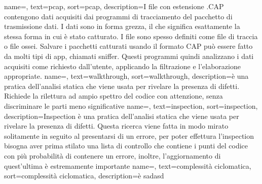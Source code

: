 {
name=,
text=pcap,
sort=pcap,
description={I file con estensione .CAP contengono dati acquisiti dai programmi di tracciamento del pacchetto di trasmissione dati.
I dati sono in forma grezza, il che significa esattamente la stessa forma in cui è stato catturato.
I file sono spesso definiti come file di traccia o file ossei.
Salvare i pacchetti catturati usando il formato CAP può essere fatto da molti tipi di app, chiamati sniffer. Questi programmi quindi analizzano i dati acquisiti come richiesto dall'utente, applicando la filtrazione e l'elaborazione appropriate.}
}
{
name=,
text=walkthrough,
sort=walkthrough,
description={è una pratica dell’analisi statica che viene usata per rivelare la presenza di difetti.
Richiede la rilettura ad ampio spettro del codice con attenzione, senza discriminare le parti meno significative}
}
{
name=,
text=inspection,
sort=inspection,
description={Inspection è una pratica dell’analisi statica che viene usata per rivelare la presenza di difetti.
Questa ricerca viene fatta in modo mirato solitamente in seguito al presentarsi di un errore, per poter effettura l'inspection bisogna aver prima stilato una lista di controllo che contiene i punti del codice con più probabilità di contenere un errore, inoltre, l'aggiornamento di quest'ultima è estremamente importante}
}
{
    name=,
    text=complessità ciclomatica,
    sort=complessità ciclomatica,
    description={è sadasd}
}

